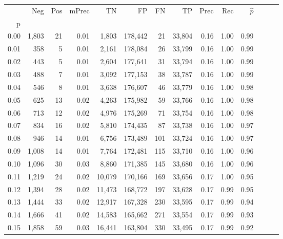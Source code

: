 \begin{tabular}{rrrrrrrrrrrrrr}
\toprule
{} &    Neg &  Pos & mPrec &       TN &       FP &      FN &      TP &  Prec &   Rec & $\hat{p}$ \\
p    &        &      &       &          &          &         &         &       &       &           \\
\midrule
0.00 &  1,803 &   21 &  0.01 &    1,803 &  178,442 &      21 &  33,804 &  0.16 &  1.00 &      0.99 \\
0.01 &    358 &    5 &  0.01 &    2,161 &  178,084 &      26 &  33,799 &  0.16 &  1.00 &      0.99 \\
0.02 &    443 &    5 &  0.01 &    2,604 &  177,641 &      31 &  33,794 &  0.16 &  1.00 &      0.99 \\
0.03 &    488 &    7 &  0.01 &    3,092 &  177,153 &      38 &  33,787 &  0.16 &  1.00 &      0.99 \\
0.04 &    546 &    8 &  0.01 &    3,638 &  176,607 &      46 &  33,779 &  0.16 &  1.00 &      0.98 \\
0.05 &    625 &   13 &  0.02 &    4,263 &  175,982 &      59 &  33,766 &  0.16 &  1.00 &      0.98 \\
0.06 &    713 &   12 &  0.02 &    4,976 &  175,269 &      71 &  33,754 &  0.16 &  1.00 &      0.98 \\
0.07 &    834 &   16 &  0.02 &    5,810 &  174,435 &      87 &  33,738 &  0.16 &  1.00 &      0.97 \\
0.08 &    946 &   14 &  0.01 &    6,756 &  173,489 &     101 &  33,724 &  0.16 &  1.00 &      0.97 \\
0.09 &  1,008 &   14 &  0.01 &    7,764 &  172,481 &     115 &  33,710 &  0.16 &  1.00 &      0.96 \\
0.10 &  1,096 &   30 &  0.03 &    8,860 &  171,385 &     145 &  33,680 &  0.16 &  1.00 &      0.96 \\
0.11 &  1,219 &   24 &  0.02 &   10,079 &  170,166 &     169 &  33,656 &  0.17 &  1.00 &      0.95 \\
0.12 &  1,394 &   28 &  0.02 &   11,473 &  168,772 &     197 &  33,628 &  0.17 &  0.99 &      0.95 \\
0.13 &  1,444 &   33 &  0.02 &   12,917 &  167,328 &     230 &  33,595 &  0.17 &  0.99 &      0.94 \\
0.14 &  1,666 &   41 &  0.02 &   14,583 &  165,662 &     271 &  33,554 &  0.17 &  0.99 &      0.93 \\
0.15 &  1,858 &   59 &  0.03 &   16,441 &  163,804 &     330 &  33,495 &  0.17 &  0.99 &      0.92 \\

\end{tabular}

